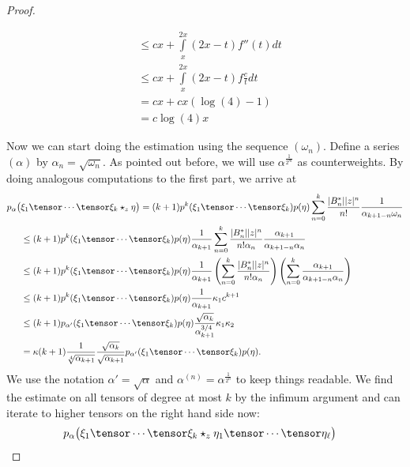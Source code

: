\documentclass[
11pt,                          %
english                        %
]{article}
\begin{document}
\begin{proof}
\begin{subproof}
\begin{align*}
			& \leq
			cx + \int\limits_x^{2x} (2x-t) f''(t) dt
			\\
			& \leq
			cx + 
			\int\limits_x^{2x} (2x-t) f\frac{c}{t} dt
			\\
			&=
			cx + cx (\log(4) - 1)
			\\
			&=
			c \log(4) x
		\end{align*}
	\end{subproof}
	Now we can start doing the estimation using the sequence $(\omega_n)$. 
	Define a series $(\alpha)$ by $\alpha_n = \sqrt{\omega_n}$. As pointed out 
	before, we will use $\alpha^{\frac{1}{2^m}}$ as counterweights.
	By doing analogous computations to the first part, we arrive at
	\begin{align*}
		p_\alpha \big(
		&
			\xi_1 \tensor \cdots \tensor \xi_k
			\star_z
			\eta
		\big)
		=
		(k+1) 
		p^k(\xi_1 \tensor \cdots \tensor \xi_k)
		p(\eta)
		\sum\limits_{n=0}^k
		\frac{|B_n^*| |z|^n}{n!}
		\frac{1}{\alpha_{k+1-n} \omega_n}
		\\
		& \leq
		(k+1) 
		p^k(\xi_1 \tensor \cdots \tensor \xi_k)
		p(\eta)
		\frac{1}{\alpha_{k+1}}
		\sum\limits_{n=0}^k
		\frac{|B_n^*| |z|^n}{n! \alpha_n}
		\frac{\alpha_{k+1}}{\alpha_{k+1-n} \alpha_n}
		\\
		& \leq
		(k+1) 
		p^k(\xi_1 \tensor \cdots \tensor \xi_k)
		p(\eta)
		\frac{1}{\alpha_{k+1}}
		\left(
			\sum\limits_{n=0}^k
			\frac{|B_n^*| |z|^n}{n! \alpha_n}
		\right)
		\left(
			\sum\limits_{n=0}^k
			\frac{\alpha_{k+1}}{\alpha_{k+1-n} \alpha_n}
		\right)
		\\
		& \leq
		(k+1) 
		p^k(\xi_1 \tensor \cdots \tensor \xi_k)
		p(\eta)
		\frac{1}{\alpha_{k+1}}
		\kappa_1
		c^{k+1}
		\\
		& \leq
		(k+1) 
		p_{\alpha'}(\xi_1 \tensor \cdots \tensor \xi_k)
		p(\eta)
		\frac{\sqrt{\alpha_k}}{\alpha_{k+1}^{3/4}}
		\kappa_1
		\kappa_2
		\\
		&=
		\kappa
		(k+1)
		\frac{1}{\sqrt[4]{\alpha_{k+1}}}
		\frac{\sqrt{\alpha_k}}{\sqrt{\alpha_{k+1}}}
		p_{\alpha'}(\xi_1 \tensor \cdots \tensor \xi_k)
		p(\eta).
	\end{align*}
	We use the notation $\alpha' = \sqrt{\alpha}$ and $\alpha^{(n)} = 
	\alpha^{\frac{1}{2^n}}$ to keep things readable. We find the estimate on all 
	tensors of degree at most $k$ by the infimum argument and can iterate to higher 
	tensors on the right hand side now:
	\begin{align*}
		p_\alpha \big(
		&
			\xi_1 \tensor \cdots \tensor \xi_k
			\star_z
			\eta_1 \tensor \cdots \tensor \eta_\ell
		\big)

\end{align*}
\end{proof}
\end{document}
